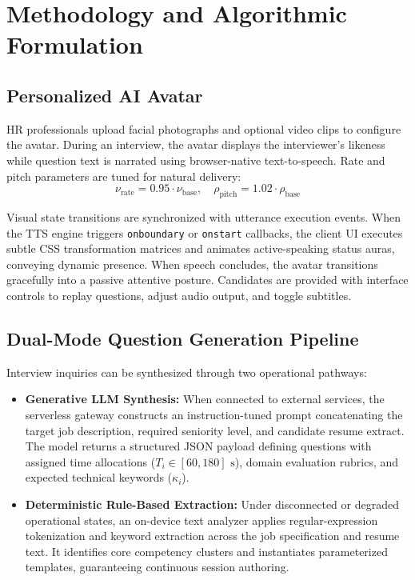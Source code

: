 \documentclass[conference]{IEEEtran}
\begin{document}
\section{Methodology and Algorithmic Formulation}

\subsection{Personalized AI Avatar}

HR professionals upload facial photographs and optional video clips to configure the avatar. During an interview, the avatar displays the interviewer's likeness while question text is narrated using browser-native text-to-speech. Rate and pitch parameters are tuned for natural delivery:
\begin{equation}
\nu_{\text{rate}} = 0.95 \cdot \nu_{\text{base}}, \quad \rho_{\text{pitch}} = 1.02 \cdot \rho_{\text{base}}
\end{equation}

Visual state transitions are synchronized with utterance execution events. When the TTS engine triggers \texttt{onboundary} or \texttt{onstart} callbacks, the client UI executes subtle CSS transformation matrices and animates active-speaking status auras, conveying dynamic presence. When speech concludes, the avatar transitions gracefully into a passive attentive posture. Candidates are provided with interface controls to replay questions, adjust audio output, and toggle subtitles.

\subsection{Dual-Mode Question Generation Pipeline}

Interview inquiries can be synthesized through two operational pathways:
\begin{itemize}
    \item \textbf{Generative LLM Synthesis:} When connected to external services, the serverless gateway constructs an instruction-tuned prompt concatenating the target job description, required seniority level, and candidate resume extract. The model returns a structured JSON payload defining questions with assigned time allocations ($T_i \in [60, 180]\text{ s}$), domain evaluation rubrics, and expected technical keywords ($\kappa_i$).
    \item \textbf{Deterministic Rule-Based Extraction:} Under disconnected or degraded operational states, an on-device text analyzer applies regular-expression tokenization and keyword extraction across the job specification and resume text. It identifies core competency clusters and instantiates parameterized templates, guaranteeing continuous session authoring.
\end{itemize}
\end{document}
